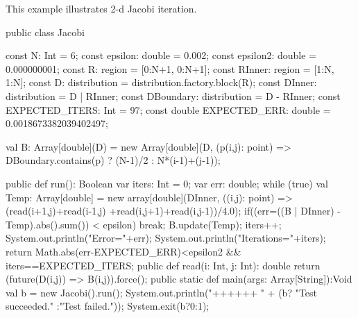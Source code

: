 
This example illustrates 2-d Jacobi iteration.

\begin{xten}
public class Jacobi {
   const N: Int = 6;
   const epsilon: double = 0.002;
   const epsilon2: double = 0.000000001;
   const R: region = [0:N+1, 0:N+1];
   const RInner: region = [1:N, 1:N];
   const D: distribution = distribution.factory.block(R);
   const DInner: distribution = D | RInner;
   const DBoundary: distribution = D - RInner;
   const EXPECTED_ITERS: Int  = 97;
   const double EXPECTED_ERR: double = 0.0018673382039402497;
     
   val B: Array[double](D) = new Array[double](D,
        (p(i,j): point) => DBoundary.contains(p) ? (N-1)/2 : N*(i-1)+(j-1));
    
   public def run(): Boolean {
      var iters: Int = 0;
      var err: double;
      while (true) {
        val Temp: Array[double] = 
           new array[double](DInner, ((i,j): point) =>
             (read(i+1,j)+read(i-1,j) +read(i,j+1)+read(i,j-1))/4.0);
        if((err=((B | DInner) - Temp).abs().sum()) < epsilon)
           break; 
        B.update(Temp);
        iters++; 
      }
      System.out.println("Error="+err);
      System.out.println("Iterations="+iters);
      return Math.abs(err-EXPECTED_ERR)<epsilon2 
          && iters==EXPECTED_ITERS;
   }
   public def read(i: Int, j: Int): double {
      return (future(D(i,j)) => B(i,j)).force();
   }
   public static def main(args: Array[String]):Void {
      val b = new Jacobi().run();
      System.out.println("++++++ "
                         + (b? "Test succeeded."
                             :"Test failed."));
      System.exit(b?0:1);
   }
}
\end{xten}
